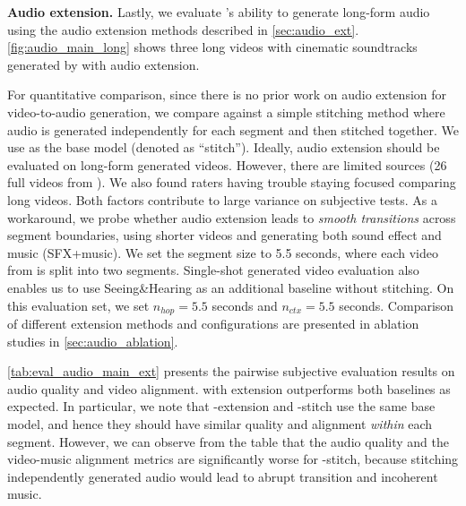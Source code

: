 \noindent\textbf{Audio extension.}
Lastly, we evaluate \OursAudio's ability to generate long-form audio using the audio extension methods described in \cref{sec:audio_ext}.
\cref{fig:audio_main_long} shows three long videos with cinematic soundtracks generated by \OursAudio with audio extension.



For quantitative comparison, since there is no prior work on audio extension for video-to-audio generation,
we compare against a simple stitching method where audio is generated independently for each segment and then stitched together.
We use \OursAudio as the base model (denoted as ``\OursAudio stitch'').
Ideally, audio extension should be evaluated on long-form generated videos.
However, there are limited sources (26 full videos from \OursAudioBenchMGen).
We also found raters having trouble staying focused comparing long videos.
Both factors contribute to large variance on subjective tests.
As a workaround, we probe whether audio extension leads to \textit{smooth transitions} across segment boundaries,
using shorter videos and generating both sound effect and music  (\OursAudioBenchSGen SFX+music).
We set the segment size to 5.5 seconds, where each video from \OursAudioBenchSGen is split into two segments.
Single-shot generated video evaluation also enables us to use Seeing\&Hearing as
an additional baseline without stitching.
On this evaluation set, we set $n_{hop} = 5.5$ seconds and $n_{ctx} = 5.5$ seconds.
Comparison of different extension methods and configurations are presented in ablation studies in \cref{sec:audio_ablation}.

\cref{tab:eval_audio_main_ext} presents the pairwise subjective evaluation results on audio quality and video alignment. \OursAudio with extension outperforms both baselines as expected.
In particular, we note that \OursAudio-extension and \OursAudio-stitch use the same base model, and hence they should have similar quality and alignment \textit{within} each segment.
However, we can observe from the table that the audio quality and the video-music alignment metrics are significantly worse for \OursAudio-stitch, because stitching independently generated audio would lead to abrupt transition and incoherent music.


